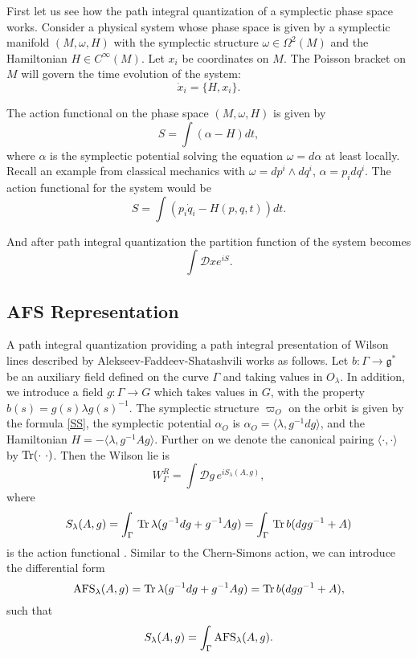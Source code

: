 \documentclass[11pt]{report}
\theoremstyle{plain}
\theoremstyle{definition}
\theoremstyle{remark}
\theoremstyle{remark}
\numberwithin{equation}{section}
\begin{document}
First let us see how the path integral quantization of a symplectic phase space works. 
Consider a physical system whose phase space is given by a symplectic manifold $(M, \omega, H)$ with the symplectic structure $\omega\in \Omega^2(M)$ and the Hamiltonian $H\in C^\infty(M)$. Let $x_i$ be coordinates on $M$. The Poisson bracket on $M$ will govern the time evolution of the system:
\begin{equation}
\dot{x}_i = \{H, x_i\}.
\end{equation}

The action functional on the phase space $(M, \omega, H)$ is given by
\begin{equation}\label{action}
S = \int (\alpha - H) dt,
\end{equation}
where $\alpha$ is the symplectic potential solving the equation $\omega = d\alpha$ at least locally. 
Recall an example from classical mechanics with $\omega = dp^i \wedge dq^i$, $\alpha = p_i dq^i$. The action functional for the system would be 
$$
S = \int \left( p_i \dot{q}_i - H(p, q, t)\right) dt.
$$

And after path integral quantization the partition function of the system becomes
\begin{equation}
\int \mathcal{D}x e^{iS}.
\end{equation}






\subsection{AFS Representation}\label{AFS_line}

A path integral quantization providing a path integral presentation of Wilson lines described by Alekseev-Faddeev-Shatashvili \cite{AFS} works as follows. Let $b: \Gamma \to \mathfrak{g}^*$ be an auxiliary field defined on the curve $\Gamma$ and taking values in $O_\lambda$. In addition, we introduce a field $g: \Gamma \to G$ which takes values in $G$, with the property $b(s)=g(s) \lambda g(s)^{-1}$. 
The symplectic structure $\varpi_O$ on the orbit is given by the formula \eqref{SS}, the symplectic potential $\alpha_O$ is $\alpha_O = \langle \lambda, g^{-1}dg\rangle$, and the Hamiltonian $H = - \langle \lambda, g^{-1}Ag\rangle$. Further on we denote the canonical pairing $\langle \cdot , \cdot \rangle$ by ${\rm Tr}( \cdot \, \, \cdot)$.
Then the Wilson lie is
%
\begin{equation}
W_\Gamma^R = \int {\mathcal{D}} g \, e^{i S_\lambda(A,g)},
\end{equation}
where 
%
\begin{equation}\label{S(g)}
S_\lambda(A, g) =  \int_\Gamma \, {\rm Tr} \, \lambda(g^{-1} dg + g^{-1} A g) =
\int_\Gamma \, {\rm Tr} \, b(dg g^{-1} + A)
\end{equation}
is the action functional . 
Similar to the Chern-Simons action, we can introduce the differential form
%
$$
{\rm AFS}_\lambda(A,g) = {\rm Tr} \, \lambda(g^{-1} dg + g^{-1} A g) =  {\rm Tr} \, b(dg g^{-1} + A),
$$
such that
%
$$
S_\lambda(A,g) = \int_\Gamma {\rm AFS}_\lambda(A,g).
$$
\end{document}
